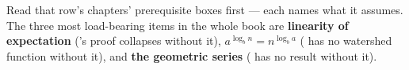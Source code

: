 \begin{alertbox}
Read that row's chapters' prerequisite boxes first --- each names what it
assumes. The three most load-bearing items in the whole book are
\textbf{linearity of expectation} ('s proof collapses without
it), \textbf{$a^{\log_{b} n} = n^{\log_{b} a}$} ( has no
watershed function without it), and \textbf{the geometric series}
( has no result without it).
\end{alertbox}
